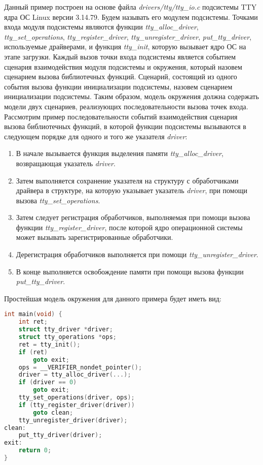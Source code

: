 Данный пример построен на основе файла \textit{drivers/tty/tty\_io.c} подсистемы TTY ядра ОС Linux версии 3.14.79.
Будем называть его модулем подсистемы.
Точками входа модуля подсистемы являются функции \textit{tty\_alloc\_driver}, \textit{tty\_set\_operations}, \textit{tty\_register\_driver}, \textit{tty\_unregister\_driver}, \textit{put\_tty\_driver}, используемые драйверами, и функция \textit{tty\_init}, которую вызывает ядро ОС на этапе загрузки.
Каждый вызов точки входа подсистемы является событием сценария взаимодействия модуля подсистемы и окружения, который назовем сценарием вызова библиотечных функций.
Сценарий, состоящий из одного события вызова функции инициализации подсистемы, назовем сценарием инициализации подсистемы.
Таким образом, модель окружения должна содержать модели двух сценариев, реализующих последовательности вызова точек входа.
Рассмотрим пример последовательности событий взаимодействия сценария вызова библиотечных функций, в которой функции подсистемы вызываются в следующем порядке для одного и того же указателя \textit{driver}:
\begin{enumerate}
    \item В начале вызывается функция выделения памяти \textit{tty\_alloc\_driver}, возвращающая указатель \textit{driver}.
    \item Затем выполняется сохранение указателя на структуру с обработчиками драйвера в структуре, на которую указывает указатель \textit{driver}, при помощи вызова \textit{tty\_set\_operations}.
    \item Затем следует регистрация обработчиков, выполняемая при помощи вызова функции \textit{tty\_register\_driver}, после которой ядро операционной системы может вызывать зарегистрированные обработчики.
    \item Дерегистрация обработчиков выполняется при помощи \textit{tty\_unregister\_driver}.
    \item В конце выполняется освобождение памяти при помощи вызова функции \textit{put\_tty\_driver}.
\end{enumerate}

Простейшая модель окружения для данного примера будет иметь вид:
\begin{lstlisting}[language=C,basicstyle=\small]
int main(void) {
    int ret;
    struct tty_driver *driver;
    struct tty_operations *ops;
    ret = tty_init();
    if (ret)
        goto exit;
    ops = __VERIFIER_nondet_pointer();
    driver = tty_alloc_driver(...);
    if (driver == 0)
        goto exit;
    tty_set_operations(driver, ops);
    if (tty_register_driver(driver))
        goto clean;
    tty_unregister_driver(driver);
clean:
    put_tty_driver(driver);
exit:
    return 0;
}
\end{lstlisting}

